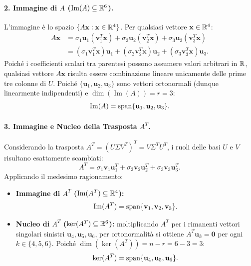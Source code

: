\paragraph{2. Immagine di $A$ ($\operatorname{Im}(A) \subseteq \mathbb{R}^6$).}
L'immagine \`e lo spazio $\{A\mathbf{x} : \mathbf{x} \in \mathbb{R}^4\}$. Per qualsiasi vettore $\mathbf{x} \in \mathbb{R}^4$:
\begin{align}
    A\mathbf{x} &= \sigma_1 \mathbf{u}_1 (\mathbf{v}_1^T \mathbf{x}) + \sigma_2 \mathbf{u}_2 (\mathbf{v}_2^T \mathbf{x}) + \sigma_3 \mathbf{u}_3 (\mathbf{v}_3^T \mathbf{x}) \nonumber \\
                &= (\sigma_1 \mathbf{v}_1^T \mathbf{x}) \mathbf{u}_1 + (\sigma_2 \mathbf{v}_2^T \mathbf{x}) \mathbf{u}_2 + (\sigma_3 \mathbf{v}_3^T \mathbf{x}) \mathbf{u}_3.
\end{align}
Poich\'e i coefficienti scalari tra parentesi possono assumere valori arbitrari in $\mathbb{R}$, qualsiasi vettore $A\mathbf{x}$ risulta essere combinazione lineare unicamente delle prime tre colonne di $U$. Poich\'e $\{\mathbf{u}_1, \mathbf{u}_2, \mathbf{u}_3\}$ sono vettori ortonormali (dunque linearmente indipendenti) e $\dim(\operatorname{Im}(A)) = r = 3$:
\begin{equation}
    \operatorname{Im}(A) = \operatorname{span}\{\mathbf{u}_1, \mathbf{u}_2, \mathbf{u}_3\}.
\end{equation}

\paragraph{3. Immagine e Nucleo della Trasposta $A^T$.}
Considerando la trasposta $A^T = (U \Sigma V^T)^T = V \Sigma^T U^T$, i ruoli delle basi $U$ e $V$ risultano esattamente scambiati:
\begin{equation}
    A^T = \sigma_1 \mathbf{v}_1 \mathbf{u}_1^T + \sigma_2 \mathbf{v}_2 \mathbf{u}_2^T + \sigma_3 \mathbf{v}_3 \mathbf{u}_3^T.
\end{equation}
Applicando il medesimo ragionamento:
\begin{itemize}
    \item \textbf{Immagine di $A^T$ ($\operatorname{Im}(A^T) \subseteq \mathbb{R}^4$):}
    \begin{equation}
        \operatorname{Im}(A^T) = \operatorname{span}\{\mathbf{v}_1, \mathbf{v}_2, \mathbf{v}_3\}.
    \end{equation}
    \item \textbf{Nucleo di $A^T$ ($\ker(A^T) \subseteq \mathbb{R}^6$):}
    moltiplicando $A^T$ per i rimanenti vettori singolari sinistri $\mathbf{u}_4, \mathbf{u}_5, \mathbf{u}_6$, per ortonormalit\`a si ottiene $A^T \mathbf{u}_k = \mathbf{0}$ per ogni $k \in \{4, 5, 6\}$. Poich\'e $\dim(\ker(A^T)) = n - r = 6 - 3 = 3$:
    \begin{equation}
        \ker(A^T) = \operatorname{span}\{\mathbf{u}_4, \mathbf{u}_5, \mathbf{u}_6\}.
    \end{equation}
\end{itemize}

